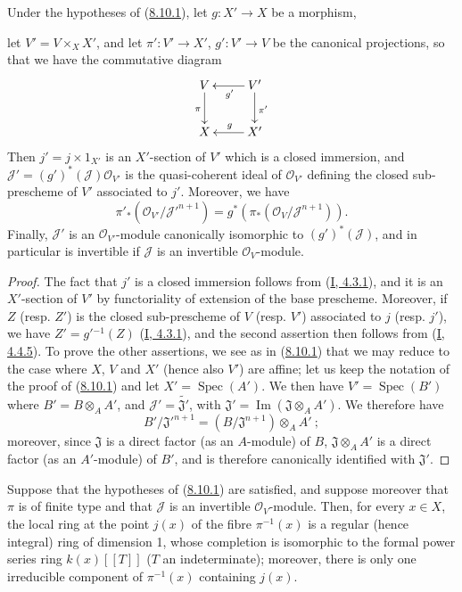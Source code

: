 \begin{lemma}[8.10.2]
\label{II.8.10.2}
Under the hypotheses of (\hyperref[II.8.10.1]{8.10.1}), let
$g:X'\to X$ be a morphism,

let $V'=V\times_X X'$, and let $\pi':V'\to X'$,
$g':V'\to V$ be the canonical projections, so that we have the commutative
diagram
\[
  \xymatrix{
    V\ar[d]_{\pi} & V'\ar[l]^{g'}\ar[d]^{\pi'}\\
    X & X'\ar[l]_{g}
  }
\]
Then $j'=j\times1_{X'}$ is an $X'$-section of $V'$ which is a closed
immersion, and $\mathcal{J}'=(g')^*(\mathcal{J})\mathcal{O}_{V'}$ is the
quasi-coherent ideal of $\mathcal{O}_{V'}$ defining the closed sub-prescheme
of $V'$ associated to $j'$. Moreover, we have
\[
  \pi'_*(\mathcal{O}_{V'}/\mathcal{J}'^{n+1})
  =g^*(\pi_*(\mathcal{O}_V/\mathcal{J}^{n+1})).
\]
Finally, $\mathcal{J}'$ is an $\mathcal{O}_{V'}$-module canonically isomorphic
to $(g')^*(\mathcal{J})$, and in particular is invertible if $\mathcal{J}$ is
an invertible $\mathcal{O}_V$-module.
\end{lemma}

\begin{proof}
The fact that $j'$ is a closed immersion follows from
(\hyperref[I.4.3.1]{I, 4.3.1}), and it is an $X'$-section of $V'$ by
functoriality of extension of the base prescheme. Moreover, if $Z$ (resp.
$Z'$) is the closed sub-prescheme of $V$ (resp. $V'$) associated to $j$ (resp.
$j'$), we have $Z'=g'{}^{-1}(Z)$
(\hyperref[I.4.3.1]{I, 4.3.1}), and the second assertion then follows from
(\hyperref[I.4.4.5]{I, 4.4.5}). To prove the other assertions, we
see as in (\hyperref[II.8.10.1]{8.10.1}) that we may reduce to the case
where $X$, $V$ and $X'$ (hence also $V'$) are affine; let us keep the
notation of the proof of (\hyperref[II.8.10.1]{8.10.1}) and let
$X'=\operatorname{Spec}(A')$. We then have $V'=\operatorname{Spec}(B')$ where
$B'=B\otimes_A A'$, and $\mathcal{J}'=\widetilde{\mathfrak{J}'}$, with
$\mathfrak{J}'=\operatorname{Im}(\mathfrak{J}\otimes_A A')$. We therefore have
\[
  B'/\mathfrak{J}'^{n+1}=(B/\mathfrak{J}^{n+1})\otimes_A A'~;
\]
moreover, since $\mathfrak{J}$ is a direct factor (as an $A$-module) of
$B$, $\mathfrak{J}\otimes_A A'$ is a direct factor (as an $A'$-module)
of $B'$, and is therefore canonically identified with $\mathfrak{J}'$.
\end{proof}

\begin{corollary}[8.10.3]
\label{II.8.10.3}
Suppose that the hypotheses of (\hyperref[II.8.10.1]{8.10.1}) are
satisfied, and suppose moreover that $\pi$ is of finite type and that
$\mathcal{J}$ is an invertible $\mathcal{O}_V$-module. Then, for every
$x\in X$, the local ring at the point $j(x)$ of the fibre $\pi^{-1}(x)$ is a
regular (hence integral) ring of dimension 1, whose completion is isomorphic
to the formal power series ring $k(x)[[T]]$ ($T$ an indeterminate); moreover,
there is only one irreducible component of $\pi^{-1}(x)$ containing $j(x)$.
\end{corollary}

